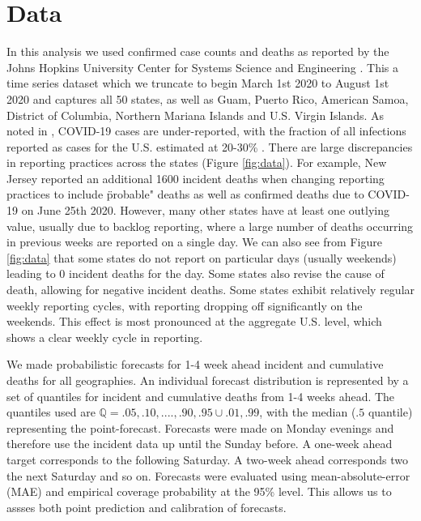 \documentclass[11pt]{amsart}
\begin{document}
\section{Data}
	In this analysis we used confirmed case counts and deaths as reported by the Johns Hopkins University Center for Systems Science and Engineering \cite{dong2020interactive}. This a time series dataset which we truncate to begin March 1st 2020 to August 1st 2020 and captures all 50 states, as well as Guam, Puerto Rico, American Samoa, District of Columbia, Northern Mariana Islands and U.S. Virgin Islands. As noted in \cite{krantz2020level}, COVID-19 cases are under-reported, with the fraction of all infections reported as cases for the U.S. estimated at 20-30\% \cite{russel2020using}. 
		There are large discrepancies in reporting practices across the states (Figure \ref{fig:data}). For example, New Jersey reported an additional 1600 incident deaths when changing reporting practices to include \"probable" deaths as well as confirmed deaths due to COVID-19 on June 25th 2020. However, many other states have at least one outlying value, usually due to backlog reporting, where a large number of deaths occurring in previous weeks are reported on a single day. We can also see from Figure \ref{fig:data} that some states do not report on particular days (usually weekends) leading to 0 incident deaths for the day. Some states also revise the cause of death, allowing for negative incident deaths.  Some states exhibit relatively regular weekly reporting cycles, with reporting dropping off significantly on the weekends. This effect is most pronounced at the aggregate U.S. level, which shows a clear weekly cycle in reporting. 
	
	
We made probabilistic forecasts  for 1-4 week ahead incident and cumulative deaths for all geographies. An individual forecast distribution is represented by a set of quantiles for incident and cumulative deaths from 1-4 weeks ahead. The quantiles used are $\mathbb{Q} = {.05,.10,....,.90,.95} \cup {.01,.99}$, with the median ($.5$ quantile) representing the point-forecast. Forecasts were made on Monday evenings and therefore use the incident data up until the Sunday before. A one-week ahead target corresponds to the following Saturday. A two-week ahead corresponds two the next Saturday and so on. Forecasts were evaluated using mean-absolute-error (MAE) and empirical coverage probability at the 95\% level. This allows us to assses both point prediction and calibration of forecasts.
\end{document}
